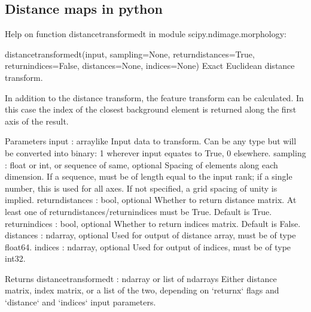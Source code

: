 \documentclass[letterpaper,10pt,english]{sphinxmanual}
\begin{document}
\noindent{}


\subsection{Distance maps in python}
\label{\detokenize{06-AdvancedShapeAndTexture:distance-maps-in-python}}
\begin{sphinxVerbatim}[commandchars=\\\{\}]
\end{sphinxVerbatim}

\begin{sphinxVerbatim}[commandchars=\\\{\}]
Help on function distance\PYGZus{}transform\PYGZus{}edt in module scipy.ndimage.morphology:

distance\PYGZus{}transform\PYGZus{}edt(input, sampling=None, return\PYGZus{}distances=True, return\PYGZus{}indices=False, distances=None, indices=None)
    Exact Euclidean distance transform.
    
    In addition to the distance transform, the feature transform can
    be calculated. In this case the index of the closest background
    element is returned along the first axis of the result.
    
    Parameters
    \PYGZhy{}\PYGZhy{}\PYGZhy{}\PYGZhy{}\PYGZhy{}\PYGZhy{}\PYGZhy{}\PYGZhy{}\PYGZhy{}\PYGZhy{}
    input : array\PYGZus{}like
        Input data to transform. Can be any type but will be converted
        into binary: 1 wherever input equates to True, 0 elsewhere.
    sampling : float or int, or sequence of same, optional
        Spacing of elements along each dimension. If a sequence, must be of
        length equal to the input rank; if a single number, this is used for
        all axes. If not specified, a grid spacing of unity is implied.
    return\PYGZus{}distances : bool, optional
        Whether to return distance matrix. At least one of
        return\PYGZus{}distances/return\PYGZus{}indices must be True. Default is True.
    return\PYGZus{}indices : bool, optional
        Whether to return indices matrix. Default is False.
    distances : ndarray, optional
        Used for output of distance array, must be of type float64.
    indices : ndarray, optional
        Used for output of indices, must be of type int32.
    
    Returns
    \PYGZhy{}\PYGZhy{}\PYGZhy{}\PYGZhy{}\PYGZhy{}\PYGZhy{}\PYGZhy{}
    distance\PYGZus{}transform\PYGZus{}edt : ndarray or list of ndarrays
        Either distance matrix, index matrix, or a list of the two,
        depending on `return\PYGZus{}x` flags and `distance` and `indices`
        input parameters.
    

\end{sphinxVerbatim}
\end{document}
